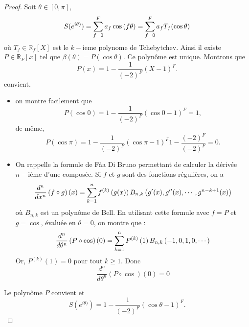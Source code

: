 \begin{proof}
Soit $\theta \in [0, \pi]$, 
\begin{equation}
S(e^{i\theta)}) = \displaystyle\sum\limits_{f=0}^F a_f \cos \left( f \theta \right) = \displaystyle\sum\limits_{f=0}^F a_f T_f ( \cos \theta )
\end{equation}
où $T_f \in \mathbb{R}_f [X]$ est le $k-$ieme polynome de Tchebytchev. 
Ainsi il existe $P \in \mathbb{R}_F [x]$ tel que $\beta( \theta ) = P( \cos \theta )$. Ce polynôme est unique. Montrons que 
\begin{equation}
P(x) = 1 -\dfrac{1}{(-2)^F} (X - 1)^F.
\end{equation}
convient.

\begin{itemize}
\item on montre facilement que 
\begin{equation}
P( \cos 0 ) = 1 -\dfrac{1}{(-2)^F} (\cos 0 - 1)^F = 1,
\end{equation}
de même,
\begin{equation}
P( \cos \pi ) = 1 -\dfrac{1}{(-2)^F} (\cos \pi - 1)^F 1 -\dfrac{(-2)^F}{(-2)^F} = 0.
\end{equation}
\item On rappelle la formule de Fàa Di Bruno permettant de calculer la dérivée $n-$ième d'une composée. Si $f$ et $g$ sont des fonctions régulières, on a 
\begin{equation}
\dfrac{d^n}{dx^n} \left( f \circ g \right)(x) = \displaystyle\sum\limits_{k=1}^n f^{(k)}\left( g(x) \right) B_{n,k}\left( g'(x), g''(x), \cdots , g^{n-k+1}(x) \right)
\end{equation}
où $B_{n,k}$ est un polynôme de Bell. En utilisant cette formule avec $f = P$ et $g = \cos$, évaluée en $\theta = 0$, on montre que :
\begin{equation}
\dfrac{d^n}{d\theta^n} \left( P \circ \cos \right)(0) = \displaystyle\sum\limits_{k=1}^n P^{(k)}\left(1\right) B_{n,k}\left( -1,0,1,0, \cdots\right)
\end{equation}
Or, $P^{(k)}\left(1\right) = 0$ pour tout $k \geq 1$. Donc 
\begin{equation}
\dfrac{d^n}{d\theta^n} \left( P \circ \cos \right)(0) = 0
\end{equation}
\end{itemize}
Le polynôme $P$ convient et 
\begin{equation}
S(e^{i\theta)}) = 1 - \dfrac{1}{(-2)^F}(\cos \theta -1)^F.
\end{equation}
\end{proof}

